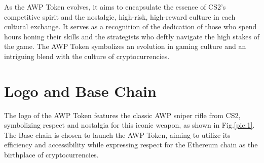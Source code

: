 \documentclass[journal,onecolumn,]{IEEEtran}
\begin{document}
	As the AWP Token evolves, it aims to encapsulate the essence of CS2's competitive spirit and the nostalgic, high-risk, high-reward culture in each cultural exchange. It serves as a recognition of the dedication of those who spend hours honing their skills and the strategists who deftly navigate the high stakes of the game. The AWP Token symbolizes an evolution in gaming culture and an intriguing blend with the culture of cryptocurrencies.
	
	\section{Logo and Base Chain}
	The logo of the AWP Token features the classic AWP sniper rifle from CS2, symbolizing respect and nostalgia for this iconic weapon, as shown in Fig.\ref{pic:1}. The Base chain is chosen to launch the AWP Token, aiming to utilize its efficiency and accessibility while expressing respect for the Ethereum chain as the birthplace of cryptocurrencies.
	
	
	
\end{document}
